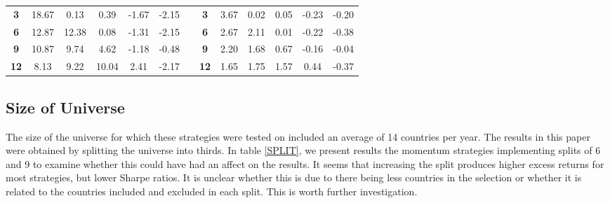 \documentclass{article}
\begin{document}
\begin{table}[htb!]
\begin{tabular}{ccccccccccccc}
    \textbf{3} & 18.67 & 0.13  & 0.39  & -1.67 & -2.15 &       & \textbf{3} & 3.67  & 0.02  & 0.05  & -0.23 & -0.20 \\
    \textbf{6} & 12.87 & 12.38 & 0.08  & -1.31 & -2.15 &       & \textbf{6} & 2.67  & 2.11  & 0.01  & -0.22 & -0.38 \\
    \textbf{9} & 10.87 & 9.74  & 4.62  & -1.18 & -0.48 &       & \textbf{9} & 2.20  & 1.68  & 0.67  & -0.16 & -0.04 \\
    \textbf{12} & 8.13  & 9.22  & 10.04 & 2.41  & -2.17 &       & \textbf{12} & 1.65  & 1.75  & 1.57  & 0.44  & -0.37 \\
    \bottomrule
    \end{tabular}%
  \label{PEGR}%
\end{table}%


\newpage

\subsection{Size of Universe}

The size of the universe for which these strategies were tested on included an average of 14 countries per year. The results in this paper were obtained by splitting the universe into thirds. In table \ref{SPLIT}, we present results the momentum strategies implementing splits of 6 and 9 to examine whether this could have had an affect on the results. It seems that increasing the split produces higher excess returns for most strategies, but lower Sharpe ratios. It is unclear whether this is due to there being less countries in the selection or whether it is related to the countries included and excluded in each split. This is worth further investigation.
\end{document}
